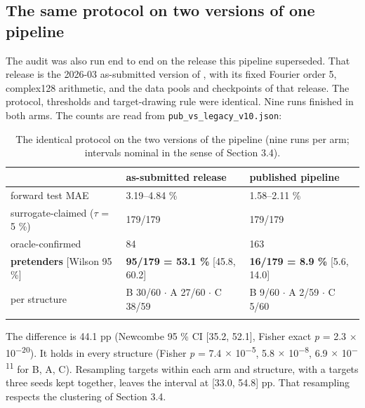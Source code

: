 \documentclass[11pt,a4paper]{article}
\begin{document}
\subsection{The same protocol on two versions of one pipeline}\label{sec:3.10}

The audit was also run end to end on the release this pipeline superseded. That release is
the 2026-03 as-submitted version of \cite{choi20261}, with its fixed Fourier order 5, complex128
arithmetic, and the data pools and checkpoints of that release. The protocol, thresholds
and target-drawing rule were identical. Nine runs finished in both arms. The counts are
read from \texttt{pub\_\allowbreak{}vs\_\allowbreak{}legacy\_\allowbreak{}v10.\allowbreak{}json}:

\begin{table}[htbp]
\centering
\small
\caption{The identical protocol on the two versions of the pipeline (nine runs per arm; intervals nominal in the sense of Section 3.4).}
\label{tab:11}
\begin{tabular}{@{}lll@{}}
\toprule\noalign{} & as-submitted release & published pipeline \\
\midrule\noalign{}
forward test MAE & 3.19--4.84 \% & 1.58--2.11 \% \\
surrogate-claimed (\ensuremath{\tau} = 5 \%) & 179/179 & 179/179 \\
oracle-confirmed & 84 & 163 \\
\textbf{pretenders} {[}Wilson 95 \%{]} & \textbf{95/179 = 53.1 \%} {[}45.8, 60.2{]} & \textbf{16/179 = 8.9 \%} {[}5.6, 14.0{]} \\
per structure & B 30/60 \ensuremath{\cdot} A 27/60 \ensuremath{\cdot} C 38/59 & B 9/60 \ensuremath{\cdot} A 2/59 \ensuremath{\cdot} C 5/60 \\
\bottomrule\noalign{}
\end{tabular}
\end{table}

The difference is 44.1 pp (Newcombe 95 \% CI {[}35.2, 52.1{]}, Fisher exact \emph{p} = 2.3 \ensuremath{\times} 10\textsuperscript{\ensuremath{-}}\textsuperscript{2}\textsuperscript{0}).
It holds in every structure (Fisher \emph{p} = 7.4 \ensuremath{\times} 10\textsuperscript{\ensuremath{-}}\textsuperscript{5}, 5.8 \ensuremath{\times} 10\textsuperscript{\ensuremath{-}}\textsuperscript{8}, 6.9 \ensuremath{\times} 10\textsuperscript{\ensuremath{-}}\textsuperscript{1}\textsuperscript{1} for
B, A, C). Resampling targets within each arm and structure, with a target\textquotesingle s three seeds
kept together, leaves the interval at {[}33.0, 54.8{]} pp. That resampling respects the
clustering of Section 3.4.
\end{document}

